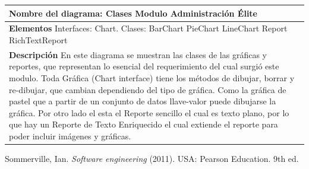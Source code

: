 \documentclass[spanish,12pt,letterpapper]{article}
\begin{document}
	\begin{tabular}{|p{10cm}|}
	\hline
	\textbf{Nombre del diagrama:} Clases Modulo Administración Élite\\
	\hline
	\textbf{Elementos} \linebreak
	Interfaces: Chart. \linebreak
	Clases:
	BarChart
	PieChart
	LineChart
	Report
	RichTextReport\\
	\hline
	\textbf{Descripción}
	En este diagrama se muestran las clases de las gráficas y reportes, que representan lo esencial del requerimiento del cual surgió este modulo. Toda Gráfica (Chart interface) tiene los métodos de dibujar, borrar y re-dibujar, que cambian dependiendo del tipo de gráfica. Como la gráfica de pastel que a partir de un conjunto de datos llave-valor puede dibujarse la gráfica. Por otro lado el esta el Reporte sencillo el cual es texto plano, por lo que hay un Reporte de Texto Enriquecido el cual extiende el reporte para poder incluir imágenes y gráficas.  \\
	\hline
	\end{tabular}
	
	\pagebreak
	\begin{thebibliography}{9}
		
		  Sommerville, Ian. 
		\emph{Software engineering} (2011). USA:  Pearson Education. 9th ed. 
		
	\end{thebibliography}
	
\end{document}
